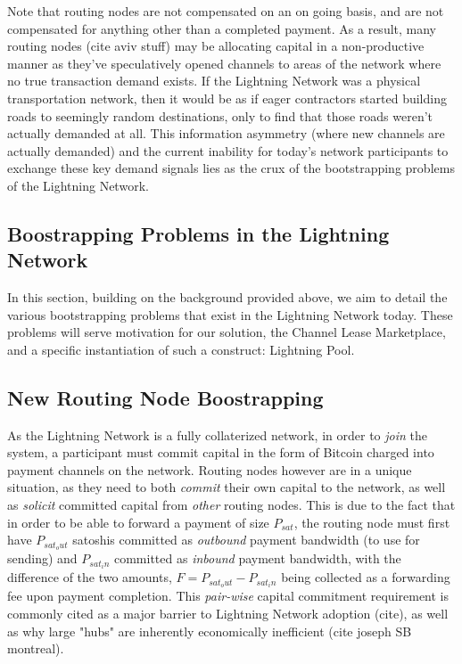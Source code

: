 \documentclass[12pt,a4paper]{article}
\theoremstyle{definition}
\begin{document}
 Note that routing nodes are not compensated on an on going basis, and are not
 compensated for anything other than a completed payment. As a result, many
 routing nodes (cite aviv stuff) may be allocating capital in a non-productive
 manner as they've speculatively opened channels to areas of the network where
 no true transaction demand exists. If the Lightning Network was a physical
 transportation network, then it would be as if eager contractors started
 building roads to seemingly random destinations, only to find that those roads
 weren't actually demanded at all. This information asymmetry (where new
 channels are actually demanded) and the current inability for today's network
 participants to exchange these key demand signals lies as the crux of the
 bootstrapping problems of the Lightning Network.


\subsection{Boostrapping Problems in the Lightning Network}

In this section, building on the background provided above, we aim to detail
the various bootstrapping problems that exist in the Lightning Network today.
These problems will serve motivation for our solution, the Channel Lease
Marketplace, and a specific instantiation of such a construct: Lightning Pool.


\subsection{New Routing Node Boostrapping}

As the Lightning Network is a fully collaterized network, in order to
\emph{join} the system, a participant must commit capital in the form of
Bitcoin charged into payment channels on the network. Routing nodes however are
in a unique situation, as they need to both \emph{commit} their own capital to
the network, as well as \emph{solicit} committed capital from \emph{other}
routing nodes. This is due to the fact that in order to be able to forward a
payment of size $P_{sat}$, the routing node must first have $P_{sat_out}$
satoshis committed as \emph{outbound} payment bandwidth (to use for sending)
and $P_{sat_in}$ committed as \emph{inbound} payment bandwidth, with the
difference of the two amounts, $F= P_{sat_out} -  P_{sat_in}$ being collected
as a forwarding fee upon payment completion. This \emph{pair-wise} capital
commitment requirement is commonly cited as a major barrier to Lightning
Network adoption (cite), as well as why large "hubs" are inherently
economically inefficient (cite joseph SB montreal).
\end{document}
